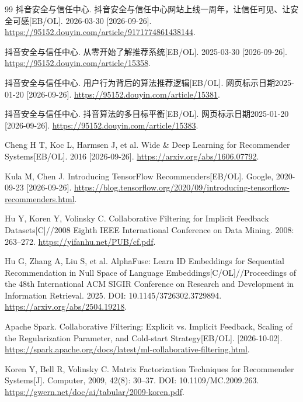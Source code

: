 \documentclass[a4paper,12pt,twoside,openany,fontset=none]{ctexbook}
\numberwithin{equation}{chapter}
\begin{document}
\begin{thebibliography}{99}
抖音安全与信任中心. 抖音安全与信任中心网站上线一周年，让信任可见、让安全可感[EB/OL]. 2026-03-30 [2026-09-26].
\newblock \url{https://95152.douyin.com/article/9171774861438144}.

抖音安全与信任中心. 从零开始了解推荐系统[EB/OL]. 2025-03-30 [2026-09-26].
\newblock \url{https://95152.douyin.com/article/15358}.

抖音安全与信任中心. 用户行为背后的算法推荐逻辑[EB/OL]. 网页标示日期2025-01-20 [2026-09-26].
\newblock \url{https://95152.douyin.com/article/15381}.

抖音安全与信任中心. 抖音算法的多目标平衡[EB/OL]. 网页标示日期2025-01-20 [2026-09-26].
\newblock \url{https://95152.douyin.com/article/15383}.

Cheng H T, Koc L, Harmsen J, et al. Wide \& Deep Learning for Recommender Systems[EB/OL]. 2016 [2026-09-26].
\newblock \url{https://arxiv.org/abs/1606.07792}.

Kula M, Chen J. Introducing TensorFlow Recommenders[EB/OL]. Google, 2020-09-23 [2026-09-26].
\newblock \url{https://blog.tensorflow.org/2020/09/introducing-tensorflow-recommenders.html}.

Hu Y, Koren Y, Volinsky C. Collaborative Filtering for Implicit Feedback Datasets[C]//2008 Eighth IEEE International Conference on Data Mining. 2008: 263--272.
\newblock \url{https://yifanhu.net/PUB/cf.pdf}.

Hu G, Zhang A, Liu S, et al. AlphaFuse: Learn ID Embeddings for Sequential Recommendation in Null Space of Language Embeddings[C/OL]//Proceedings of the 48th International ACM SIGIR Conference on Research and Development in Information Retrieval. 2025.
\newblock DOI: 10.1145/3726302.3729894. \url{https://arxiv.org/abs/2504.19218}.

Apache Spark. Collaborative Filtering: Explicit vs. Implicit Feedback, Scaling of the Regularization Parameter, and Cold-start Strategy[EB/OL]. [2026-10-02].
\newblock \url{https://spark.apache.org/docs/latest/ml-collaborative-filtering.html}.

Koren Y, Bell R, Volinsky C. Matrix Factorization Techniques for Recommender Systems[J]. Computer, 2009, 42(8): 30--37.
\newblock DOI: 10.1109/MC.2009.263. \url{https://gwern.net/doc/ai/tabular/2009-koren.pdf}.


\end{thebibliography}
\end{document}
